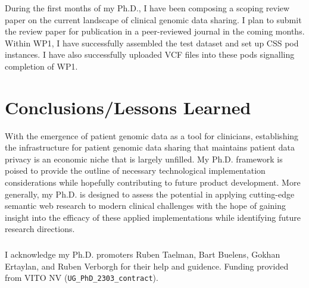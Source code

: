 \documentclass[runningheads]{llncs}
\begin{document}
During the first months of my Ph.D., I have been composing a scoping review paper on the current landscape of clinical genomic data sharing.
I plan to submit the review paper for publication in a peer-reviewed journal in the coming months.
Within WP1, I have successfully assembled the test dataset and set up CSS pod instances.
I have also successfully uploaded VCF files into these pods signalling completion of WP1. 


\section{Conclusions/Lessons Learned}
\begin{comment}
Present your conclusions and lessons learned. Describe how your results will or might impact research or the world at large. We do neither expect you to have solved all issues nor expect you to have finished your Ph.D. However, we expect you to show an understanding of your research area in general and to have a clear plan towards addressing your research questions. This symposium is the best place to discuss these issues and plans with experienced researchers and fellow students to get informed feedback.
\end{comment}

With the emergence of patient genomic data as a tool for clinicians, establishing the infrastructure for patient genomic data sharing that maintains patient data privacy is an economic niche that is largely unfilled. 
My Ph.D. framework is poised to provide the outline of necessary technological implementation considerations while hopefully contributing to future product development. 
More generally, my Ph.D. is designed to assess the potential in applying cutting-edge semantic web research to modern clinical challenges with the hope of gaining insight into the efficacy of these applied implementations while identifying future research directions.



\subsubsection{\ackname} 
I acknowledge my Ph.D. promoters Ruben Taelman, Bart Buelens, Gokhan Ertaylan, and Ruben Verborgh for their help and guidence.
Funding provided from VITO NV (\verb|UG_PhD_2303_contract|). 



\end{document}
